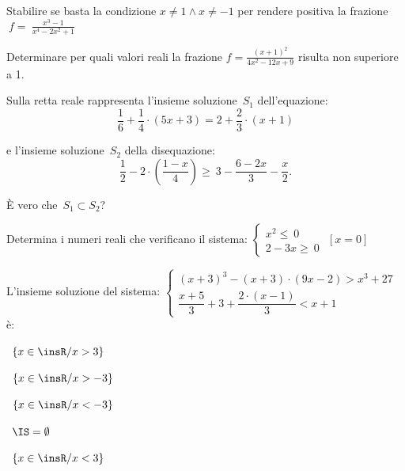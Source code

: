 \begin{esercizio}
 \label{ese:4.73}
Stabilire se basta la condizione \(x\neq 1\wedge x\neq -1\) per rendere positiva 
la frazione \(~f=~\frac{x^3-1}{x^4-2x^2+1}\)
\end{esercizio}

\begin{esercizio}
 \label{ese:4.74}
Determinare per quali valori reali la frazione \(f=\frac{(x+1)^2}{4x^2-12x+9}\) 
risulta non superiore a 1.
\end{esercizio}


\begin{esercizio}
 \label{ese:21.33}
Sulla retta reale rappresenta l'insieme soluzione~\(S_{1}\)
dell'equazione:
\[\frac{1}{6}+\frac{1}{4}\cdot (5x+3)=2+\frac{2}{3}\cdot (x+1)\]

e l'insieme soluzione~\(S_{2}\) della disequazione:
\[\frac{1}{2}-2\cdot\left(\frac{1-x}{4}\right)\ge~3-\frac{6-2x}{3}-\frac{x}{2}.\]

È vero che~\(S_{1}\subset S_{2}\)?
\end{esercizio}

\begin{esercizio}[\Ast]
 \label{ese:21.34}
 Determina i numeri reali che verificano il sistema:
 \(\left\{%
  \begin{array}{l}
  x^{2}\le~0
  \\2-3x\ge~0
 \end{array}\right.\)
\hfill \(\left[x = 0\right]\)
 \end{esercizio}

\begin{esercizio}
 \label{ese:21.35}
 L'insieme soluzione del sistema:
\(\left\{\begin{array}{l}
  (x+3)^{3}-(x+3)\cdot (9x-2)>x^{3}+27\\
  \dfrac{x+5}{3}+3+\dfrac{2\cdot (x-1)}{3}<x+1
 \end{array}\right.\) è:
\begin{multicols}{2}
\boxA\quad~\(\left\{x\in \insR/x>3\right\}\)

\boxB\quad~\(\left\{x\in \insR/x>-3\right\}\)

\boxC\quad~\(\left\{x\in \insR/x<-3\right\}\)

\boxD\quad~\(\IS=\emptyset \)

\boxE\quad~\(\left\{x\in\insR/x<3\right\}\)
\end{multicols}

\end{esercizio}

